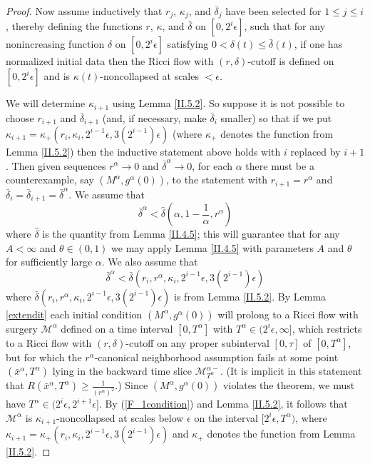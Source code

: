 \documentclass[12pt]{amsart}
\newcommand{\al}{\alpha}
\newcommand{\M}{{\mathcal M}}
\renewcommand{\th}{\theta}
\newcommand{\de}{\delta}
\newcommand{\eps}{\epsilon}
\newcommand{\ra}{\rightarrow}
\numberwithin{equation}{section}
\theoremstyle{plain}
\theoremstyle{definition}
\theoremstyle{remark}
\begin{document}
\begin{proof}
Now assume inductively that $r_j$, $\kappa_j$, and $\bar\de_j$
have been selected for $1\leq j\leq i$, thereby defining
the functions $r$, $\kappa$, and $\bar\delta$ 
on $[0, 2^i\eps]$, such that for 
any nonincreasing function $\de$ on $[0,2^i\eps]$ satisfying 
$0<\de(t)\leq \bar\de(t)$, if one has normalized
initial data then the Ricci flow with $(r,\de)$-cutoff
is defined on $[0,2^i\eps]$ and is $\kappa(t)$-noncollapsed at
scales $<\eps$.

We will determine $\kappa_{i+1}$ using Lemma \ref{II.5.2}.
So suppose it is not possible to choose $r_{i+1}$
and $\bar\de_{i+1}$ (and, if necessary, make $\bar\de_i$ smaller)
so that if we put
$\kappa_{i+1}= \kappa_+(r_i,\kappa_i,2^{i-1}\eps,
3(2^{i-1})\eps)$ (where $\kappa_+$ denotes the function from
Lemma \ref{II.5.2})
then the inductive statement above holds with $i$ replaced by $i+1$.
Then given sequences $r^\al\ra 0$ and $\bar\de^\al\ra 0$, for each
$\al$ there
must be a counterexample, say $(M^{\al},g^{\al}(0))$,
to the statement with $r_{i+1} = r^{\al}$ and
$\bar\de_i = \bar\de_{i+1} = \bar\de^{\al}$. We assume that  
\begin{equation}
  \bar\de^\al < \hat\de(\al,1-\frac{1}{\al},r^\al)
\end{equation}
where $\hat\de$ is the quantity from Lemma \ref{II.4.5}; this
will guarantee that for any $A<\infty$ and $\th\in (0,1)$
we may apply Lemma \ref{II.4.5} with parameters $A$ and $\th$
for sufficiently large $\al$.  We also assume that 
\begin{equation}
\label{F_1condition}
\bar\de^{\al}<\bar\de(r_i,r^\al,\kappa_i,2^{i-1}\eps,3(2^{i-1})\eps)
\end{equation}
where $\bar\de(r_i,r^\al,\kappa_i,2^{i-1}\eps,3(2^{i-1})\eps)$ is from Lemma \ref{II.5.2}.
 By Lemma \ref{extendit}  each initial condition $(M^{\al},g^{\al}(0))$
will prolong to a Ricci flow
with surgery   $\M^{\al}$ defined on a time interval $[0,T^{\al}]$
with 
$T^{\al}\in (2^i\eps,\infty]$,
which restricts to a Ricci flow with $(r,\de)$-cutoff
on any proper subinterval  $[0,\tau]$ of $[0,T^{\al}]$,
 but for which the
$r^\al$-canonical neighborhood assumption fails at some point
$(\bar x^{\al},T^{\al})$ lying in the backward time
slice 
$\M^{\al-}_{T^{\al}}$.
(It is implicit in this statement that $R(\bar x^{\al},T^{\al}) \ge 
\frac{1}{(r^\al)^2}$.)
Since $(M^{\al},g^{\al}(0))$ violates the
theorem, we must have $T^\al\in (2^i\eps,2^{i+1}\eps]$. By (\ref{F_1condition})
and Lemma \ref{II.5.2}, it follows that  $\M^{\al}$ is 
$\kappa_{i+1}$-noncollapsed at scales below $\eps$
on the interval $[2^i \epsilon,T^\al)$, where 
$\kappa_{i+1}= \kappa_+(r_i,\kappa_i,2^{i-1}\eps,
3(2^{i-1})\eps)$ and $\kappa_+$ denotes the function from
Lemma \ref{II.5.2}.  


\end{proof}
\end{document}
